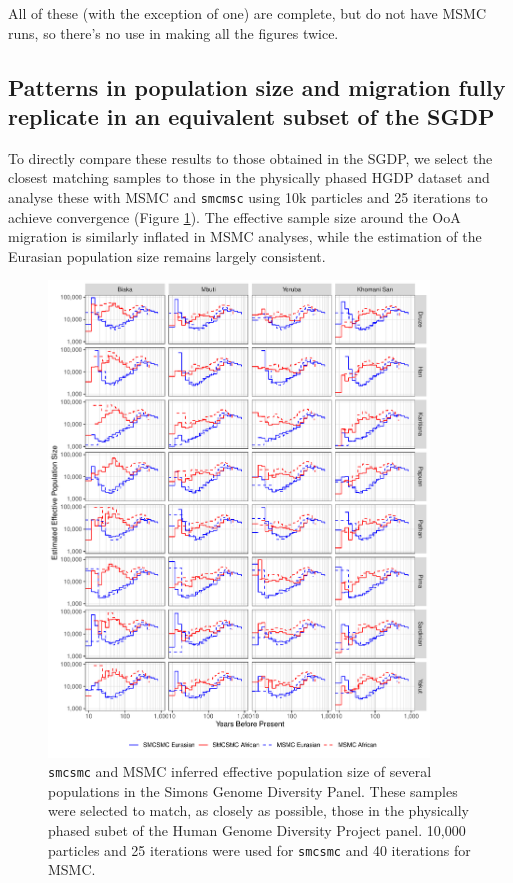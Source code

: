 \documentclass{article}
\begin{document}
{\color{red} All of these (with the exception of one) are complete, but do not have MSMC runs, so there's no use in making all the figures twice.}


\subsection{Patterns in population size and migration fully replicate in an equivalent subset of the SGDP}
To directly compare these results to those obtained in the SGDP, we select the closest matching samples to those in the physically phased HGDP dataset and analyse these with MSMC and {\tt smcmsc} using 10k particles and 25 iterations to achieve convergence (Figure \ref{hgdp_sgdp_ne}). The effective sample size around the OoA migration is similarly inflated in MSMC analyses, while the estimation of the Eurasian population size remains largely consistent.  

\begin{figure}
    \centering
    \includegraphics[width=0.9\textwidth]{../plot/sgdp_subet_ne.pdf}
    \caption{{\tt smcsmc} and MSMC inferred effective population size of several populations in the Simons Genome Diversity Panel. These samples were selected to match, as closely as possible, those in the physically phased subet of the Human Genome Diversity Project panel. 10,000 particles and 25 iterations were used for {\tt smcsmc} and 40 iterations for MSMC.}
    \label{hgdp_sgdp_ne}
\end{figure}
\end{document}
